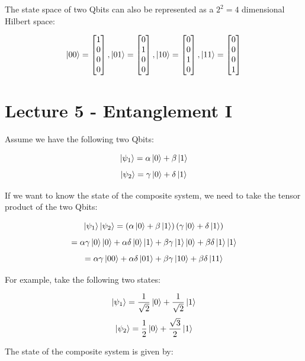 \documentclass[12pt]{article}
\begin{document}
\noindent
The state space of two Qbits can also be represented as a $2^2 = 4$ dimensional Hilbert space:

\[ \ket{00} = \begin{bmatrix} 1 \\ 0 \\ 0 \\ 0 \end{bmatrix} , \ket{01} = \begin{bmatrix} 0 \\ 1 \\ 0 \\ 0 \end{bmatrix} , \ket{10} = \begin{bmatrix} 0 \\ 0 \\ 1 \\ 0 \end{bmatrix} , \ket{11} = \begin{bmatrix} 0 \\ 0 \\ 0 \\ 1 \end{bmatrix} \]

%
%
\newpage
\section*{Lecture 5 - Entanglement I}
Assume we have the following two Qbits:

\[ \ket{\psi_1} = \alpha \ket{0} + \beta \ket{1} \]
\[ \ket{\psi_2} = \gamma \ket{0} + \delta \ket{1} \]

\noindent
If we want to know the state of the composite system, we need to take the tensor product of the two Qbits:

\[ \ket{\psi_1}\ket{\psi_2} = \left( \alpha \ket{0} + \beta \ket{1} \right) \left( \gamma \ket{0} + \delta \ket{1} \right) \]
\[ = \alpha \gamma \ket{0}\ket{0} + \alpha \delta \ket{0}\ket{1} + \beta \gamma \ket{1}\ket{0} + \beta \delta \ket{1}\ket{1} \]
\[ = \alpha \gamma \ket{00} + \alpha \delta \ket{01} + \beta \gamma \ket{10} + \beta \delta \ket{11} \]

\noindent
For example, take the following two states:

\[ \ket{\psi_1} = \frac{1}{\sqrt{2}}\ket{0} + \frac{1}{\sqrt{2}}\ket{1} \]
\[ \ket{\psi_2} = \frac{1}{2}\ket{0} + \frac{\sqrt{3}}{2}\ket{1} \]

\noindent
The state of the composite system is given by:
\end{document}
